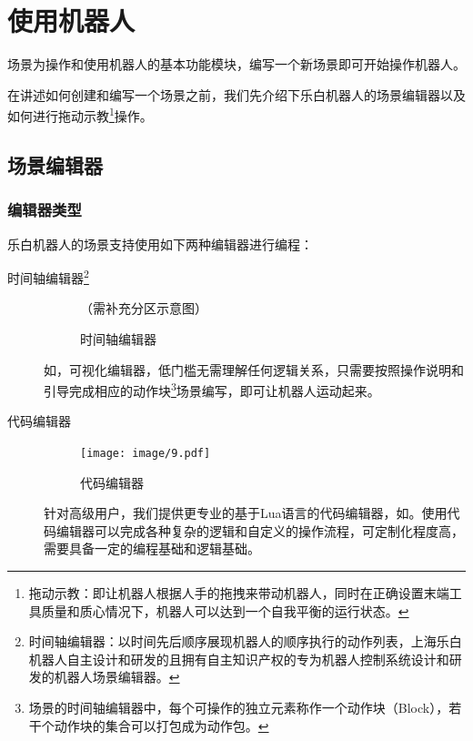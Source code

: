 \chapter{使用机器人}

场景为操作和使用机器人的基本功能模块，编写一个新场景即可开始操作机器人。

在讲述如何创建和编写一个场景之前，我们先介绍下乐白机器人的场景编辑器以及如何进行拖动示教\footnote{拖动示教：即让机器人根据人手的拖拽来带动机器人，同时在正确设置末端工具质量和质心情况下，机器人可以达到一个自我平衡的运行状态。}操作。

\section{场景编辑器}
\subsection{编辑器类型}
乐白机器人的场景支持使用如下两种编辑器进行编程：
\begin{description}
	\item [时间轴编辑器\footnote{时间轴编辑器：以时间先后顺序展现机器人的顺序执行的动作列表，上海乐白机器人自主设计和研发的且拥有自主知识产权的专为机器人控制系统设计和研发的机器人场景编辑器。}]

	\begin{figure}[ht]
		\centering
		\color{red}（需补充分区示意图）
		\caption{时间轴编辑器}
		\label{fig:时间轴编辑器}
	\end{figure}

	如，可视化编辑器，低门槛无需理解任何逻辑关系，只需要按照操作说明和引导完成相应的动作块\footnote{场景的时间轴编辑器中，每个可操作的独立元素称作一个动作块（Block），若干个动作块的集合可以打包成为动作包。}场景编写，即可让机器人运动起来。

	\item [代码编辑器]

	\begin{figure}[ht]
		\centering
		\texttt{[image: image/9.pdf]}
		\caption{代码编辑器}
		\label{fig:代码编辑器}
	\end{figure}

	针对高级用户，我们提供更专业的基于Lua语言的代码编辑器，如。使用代码编辑器可以完成各种复杂的逻辑和自定义的操作流程，可定制化程度高，需要具备一定的编程基础和逻辑基础。

\end{description}

